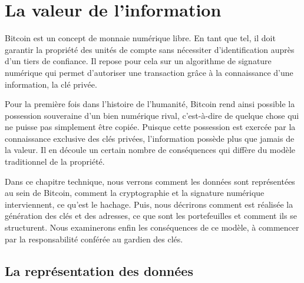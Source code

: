
\chapter{La valeur de l'information}
\label{ch:propriete} \label{enotezch:7}

Bitcoin est un concept de monnaie numérique libre. En tant que tel, il doit garantir la propriété des unités de compte sans nécessiter d'identification auprès d'un tiers de confiance. Il repose pour cela sur un algorithme de signature numérique qui permet d'autoriser une transaction grâce à la connaissance d'une information, la clé privée.

Pour la première fois dans l'histoire de l'humanité, Bitcoin rend ainsi possible la possession souveraine d'un bien numérique rival, c'est-à-dire de quelque chose qui ne puisse pas simplement être copiée. Puisque cette possession est exercée par la connaissance exclusive des clés privées, l'information possède plus que jamais de la valeur. Il en découle un certain nombre de conséquences qui diffère du modèle traditionnel de la propriété.


Dans ce chapitre technique, nous verrons comment les données sont représentées au sein de Bitcoin, comment la cryptographie et la signature numérique interviennent, ce qu'est le hachage. Puis, nous décrirons comment est réalisée la génération des clés et des adresses, ce que sont les portefeuilles et comment ils se structurent. Nous examinerons enfin les conséquences de ce modèle, à commencer par la responsabilité conférée au gardien des clés.

\section*{La représentation des données}


